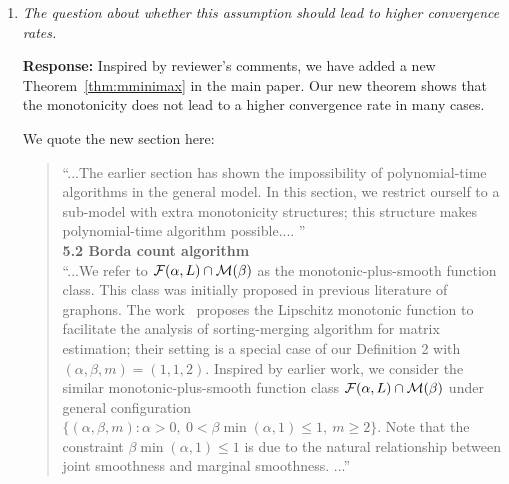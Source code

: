 \documentclass[11pt]{article}
\theoremstyle{plain}
\theoremstyle{definition}
\begin{document}
\begin{enumerate}[wide, labelwidth=!, labelindent=0pt]
\begin{quote}
\begin{proof}[Proof of Theorem~\ref{thm:nopoly}]
where the last inequality is true under the regime $c_1^mc_2>2u^2$. We can always choose constants $c_1$ and $c_2$ given the value $u$. The inequality $(**)$ holds because of the statement~\eqref{eq:markov}. 
Putting Type I and II errors together, we obtain
\begin{align}
 \mathbb{P}_{\tH_0}(\phi(\tY) = 1)+ \sup_{\Theta\in\Theta_{\text{CHC}}(\mk,\md,\lambda)}\mathbb{P}_{\Theta}(\phi(\tY) =0) \leq 2b/u < 1/2,
\end{align}
for $u>4b$. This fact contradicts the Proposition~\ref{prop:CHC}.  Therefore, there is no polynomial-time $\hat\Theta$ satisfying \eqref{eq:esterror}.
\end{proof}
\end{quote}

    \item \textit{The question about whether this assumption should lead to higher convergence rates.}
    
    \textbf{Response:} 
Inspired by reviewer's comments, we have added a new Theorem~\ref{thm:mminimax} in the main paper. Our new theorem shows that the monotonicity does not lead to a higher convergence rate in many cases. 

We quote the new section here:
 \begin{quote}
{\color{blue}

``...The earlier section has shown the impossibility of polynomial-time algorithms in the general model. In this section, we restrict ourself to a sub-model with extra monotonicity structures; this structure makes polynomial-time algorithm possible.... ''\\

{\bf 5.2 Borda count algorithm}\\

``...We refer to $\mathcal{F}(\alpha,L)\cap \mathcal{M}(\beta)$ as the monotonic-plus-smooth function class. This class was initially proposed in previous literature of graphons. The work~\cite{chan2014consistent} proposes the Lipschitz monotonic function to facilitate the analysis of sorting-merging algorithm for matrix estimation; their setting is a special case of our Definition 2 with $(\alpha,\beta,m)=(1,1,2)$. Inspired by earlier work, we consider the similar monotonic-plus-smooth function class $\mathcal{F}(\alpha,L)\cap \mathcal{M}(\beta)$ under general configuration $\{(\alpha,\beta,m): \alpha>0,\ 0<\beta\min(\alpha,1)\leq 1, \ m\geq 2\}$. Note that the constraint $\beta \min(\alpha, 1) \leq 1$ is due to the natural relationship between joint smoothness and marginal smoothness. ...''\\

}
\end{quote}
\end{enumerate}
\end{document}
